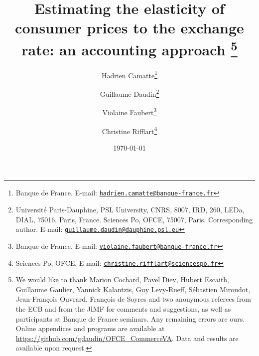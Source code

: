 \documentclass[11pt,a4paper]{paper} %
\newcommand{\email}[1]{\href{mailto:#1}{\nolinkurl{#1}}}
\begin{document}
\title{Estimating the elasticity of consumer prices to the exchange rate: an accounting approach	\thanks{We would like to thank Marion Cochard, Pavel Diev, Hubert Escaith, Guillaume Gaulier, Yannick Kalantzis, Guy Levy-Rueff, Sébastien Miroudot, Jean-François Ouvrard, François de Soyres and two anonymous referees from the ECB and from the JIMF for comments and suggestions, as well as participants at Banque de France seminars. Any remaining errors are ours. Online appendices and programs are available at \url{https://github.com/gdaudin/OFCE_CommerceVA}. Data and results are available upon request.}\\
\vspace{1cm}
}
\vspace{1cm}
\date{\today}
\author{
	Hadrien Camatte\thanks{Banque de France. E-mail: \email{hadrien.camatte@banque-france.fr}}
	\and
	Guillaume Daudin\thanks{Université Paris-Dauphine, PSL University, CNRS, 8007, IRD, 260, LEDa, DIAL, 75016, Paris, France. Sciences Po, OFCE, 75007, Paris. Corresponding author. E-mail: \email{guillaume.daudin@dauphine.psl.eu}}
	\and
	Violaine Faubert\thanks{Banque de France. E-mail: \email{violaine.faubert@banque-france.fr}}
	\and
	\and
	Christine Rifflart\thanks{Sciences Po, OFCE. E-mail: \email{christine.rifflart@sciencespo.fr}}
}
\maketitle

\end{document}
